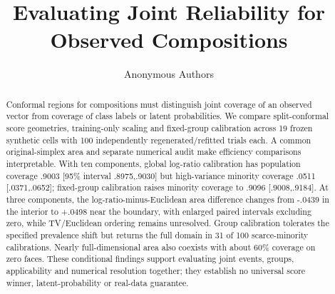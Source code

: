 \documentclass{article}
\title{Evaluating Joint Reliability for Observed Compositions}
\author{Anonymous Authors}
\begin{document}
\maketitle
\begin{abstract}
Conformal regions for compositions must distinguish joint coverage of an observed vector from coverage of class labels or latent probabilities. We compare split-conformal score geometries, training-only scaling and fixed-group calibration across 19 frozen synthetic cells with 100 independently regenerated/refitted trials each. A common original-simplex area and separate numerical audit make efficiency comparisons interpretable. With ten components, global log-ratio calibration has population coverage .9003 [95\% interval .8975,.9030] but high-variance minority coverage .0511 [.0371,.0652]; fixed-group calibration raises minority coverage to .9096 [.9008,.9184]. At three components, the log-ratio-minus-Euclidean area difference changes from -.0439 in the interior to +.0498 near the boundary, with enlarged paired intervals excluding zero, while TV/Euclidean ordering remains unresolved. Group calibration tolerates the specified prevalence shift but returns the full domain in 31 of 100 scarce-minority calibrations. Nearly full-dimensional area also coexists with about 60\% coverage on zero faces. These conditional findings support evaluating joint events, groups, applicability and numerical resolution together; they establish no universal score winner, latent-probability or real-data guarantee.
\end{abstract}







\clearpage


\clearpage
\appendix

\clearpage

\clearpage

\clearpage

\clearpage

\end{document}
